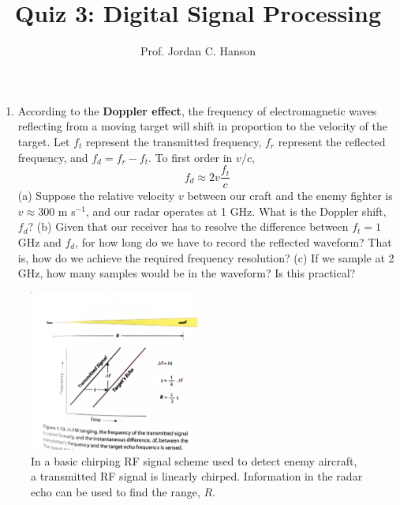 \documentclass{article}
\begin{document}
\twocolumn

\title{Quiz 3: Digital Signal Processing}
\author{Prof. Jordan C. Hanson}

\maketitle
\small

\begin{enumerate}
\item According to the \textbf{Doppler effect}, the frequency of electromagnetic waves reflecting from a moving target will shift in proportion to the velocity of the target.  Let $f_t$ represent the transmitted frequency, $f_r$ represent the reflected frequency, and $f_d = f_r - f_t$.  To first order in $v/c$, 
\begin{equation}
f_d \approx 2 v \frac{f_t}{c}
\end{equation}
(a) Suppose the relative velocity $v$ between our craft and the enemy fighter is $v \approx 300$ m s$^{-1}$, and our radar operates at 1 GHz.  What is the Doppler shift, $f_d$? (b) Given that our receiver has to resolve the difference between $f_t = 1$ GHz and $f_d$, for how long do we have to record the reflected waveform? That is, how do we achieve the required frequency resolution? (c) If we sample at 2 GHz, how many samples would be in the waveform?  Is this practical? \\ \vspace{3cm}
\end{enumerate}

\begin{figure}
\centering
\includegraphics[width=0.5\textwidth,trim=0cm 6cm 0cm 0cm,clip=true]{radar.pdf}
\caption{\label{fig:1} In a basic chirping RF signal scheme used to detect enemy aircraft, a transmitted RF signal is linearly chirped.  Information in the radar echo can be used to find the range, $R$.}
\end{figure}
\end{document}
